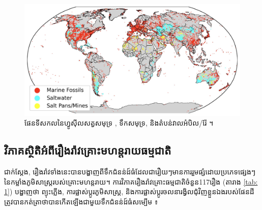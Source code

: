 \documentclass[10pt,twocolumn,letterpaper]{article}
\begin{document}
\begin{figure}[b]
\begin{center}

\includegraphics[width=1\textwidth]{marine.jpg}
\end{center}
   \caption{ផែនទីសកលនៃហ្វូស៊ីលសត្វសមុទ្រ , ទឹកសមុទ្រ, និងតំបន់វាលអំបិល/រ៉ែ \cite{15,16,86,87}។}
   \label{fig:2}
\end{figure}

\subsection{វិភាគស្ថិតិអំពីរឿងរ៉ាវគ្រោះមហន្តរាយធម្មជាតិ}

ជាក់ស្តែង, រឿងរ៉ាវទាំងនេះបានបង្ហាញពីទឹកជំនន់ដ៍ធំដែលជារឿយៗមានការរួមផ្សំដោយប្រភេទផ្សេងៗនៃកម្លាំងភូមិសាស្ត្ររបស់គ្រោះមហន្តរាយ។ ការវិភាគរឿងរ៉ាវគ្រោះធម្មជាតិចំនួន​117រឿង​ (តារាង \ref{tab: 1}) បង្ហាញថា ព្យុះភ្លើង, ការផ្លាស់ប្ដូរភូមិសាស្ត្រ, និងការផ្លាស់ប្ដូរចលនារង្វិលជុំវិញខ្លួនឯងរបស់ផែនដីត្រូវបានកត់ត្រាថាបានកើតឡើងជាមួយទឹកជំនន់ដ៍ធំសម្បើម \cite{14}៖
\end{document}
